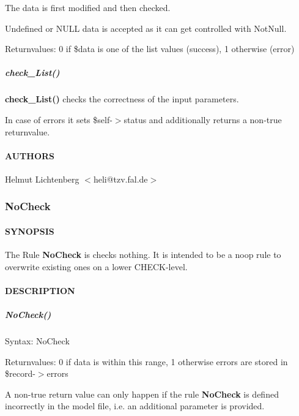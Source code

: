 The data is first modified and then checked.



Undefined or NULL data is accepted as it can get controlled with NotNull.



Returnvalues:
   0 if \$data is one of the list values (success),
   1 otherwise (error)

\subparagraph*{check\_List()\label{List_check_List_}}


\textbf{check\_List()} checks the correctness of the input parameters.



In case of errors it sets \$self-$>$status and additionally returns a non-true
returnvalue.

\paragraph*{AUTHORS\label{List_AUTHORS}}


Helmut Lichtenberg $<$heli@tzv.fal.de$>$

\subsubsection{NoCheck\label{NoCheck}}




\paragraph*{SYNOPSIS\label{NoCheck_SYNOPSIS}}


The Rule \textbf{NoCheck} is checks nothing. It is intended to be a noop rule to
overwrite existing ones on a lower CHECK-level.

\paragraph*{DESCRIPTION\label{NoCheck_DESCRIPTION}}
\subparagraph*{NoCheck()\label{NoCheck_NoCheck_}}


Syntax: NoCheck



Returnvalues:
   0 if data is within this range, 1 otherwise
   errors are stored in \$record-$>$errors



A non-true return value can only happen if the rule \textbf{NoCheck} is defined
incorrectly in the model file, i.e. an additional parameter is provided.

